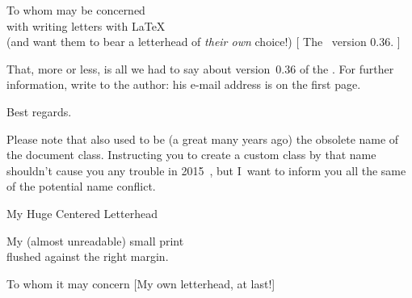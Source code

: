 \begin{letterhead}{
	To whom may be concerned\\
	with writing letters with \LaTeX\\
	(and want them to bear a letterhead
	of \emph{their own} choice!)
}[
	The \Bundle\ version 0.36.
]
\epilogue

That, more or less, is all we had to say about version~0.36 of the \Bundle.  For
further information, write to the author: his e-mail address is on the first
page.

\closing*{Best regards.}

\PS
Please note that  also used to be (a great many years ago)
the obsolete name of the  document class.  Instructing you to
create a custom class by that name shouldn't cause you any trouble in
2015~\facesmile, but I~want to inform you all the same of the potential name
conflict.

\end{letterhead}







\begingroup

\date{February~8, 2015}

\begin{customletterhead}{\textwidth}
	\centering \Huge
	My Huge	Centered Letterhead
\end{customletterhead}
\begin{customletterfoot}{\textwidth}
	\raggedleft	\tiny
	My (almost unreadable) small print\\
	flushed against the right margin.
\end{customletterfoot}
\setlength{}
\let \foldingtagrule = \CDPFactoryFoldingTagRule

\begin{foldedletterhead}
	{To	whom it	may	concern}
	[My	own	letterhead,	at last!]

\makepresentation
\maketopdate\relax

\lipsum[1-2]

\makesignature

\end{foldedletterhead}







